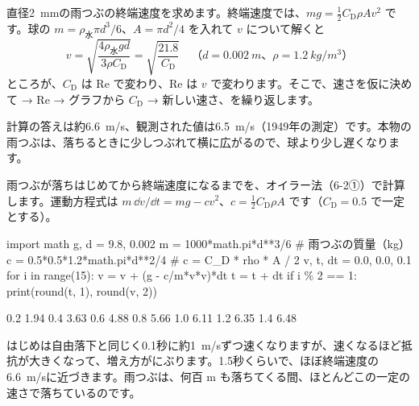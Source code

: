 直径\qty{2}{mm}の雨つぶの終端速度を求めます。終端速度では、$mg=\tfrac{1}{2}C_{\mathrm D}\rho Av^2$ です。球の $m=\rho_{\text{水}}\pi d^3/6$、$A=\pi d^2/4$ を入れて $v$ について解くと
\[v=\sqrt{\frac{4\rho_{\text{水}}gd}{3\rho C_{\mathrm D}}}=\sqrt{\frac{21.8}{C_{\mathrm D}}}\quad\text{（}d=\qty{0.002}{m}\text{、}\rho=\qty{1.2}{kg/m^3}\text{）}\]
ところが、$C_{\mathrm D}$ は Re で変わり、Re は $v$ で変わります。そこで、速さを仮に決めて → Re → グラフから $C_{\mathrm D}$ → 新しい速さ、を繰り返します。

\begin{bkcenter}
\end{bkcenter}

\noindent 計算の答えは約\qty{6.6}{m/s}、観測された値は\qty{6.5}{m/s}（1949年の測定）です。本物の雨つぶは、落ちるときに少しつぶれて横に広がるので、球より少し遅くなります。

雨つぶが落ちはじめてから終端速度になるまでを、オイラー法（6-2①）で計算します。運動方程式は $m\,\dd v/\dd t=mg-cv^2$、$c=\tfrac{1}{2}C_{\mathrm D}\rho A$ です（$C_{\mathrm D}=0.5$ で一定とする）。
\begin{phcode}
import math
g, d = 9.8, 0.002
m = 1000*math.pi*d**3/6       \# 雨つぶの質量（kg）
c = 0.5*0.5*1.2*math.pi*d**2/4 \# c = C\_D * rho * A / 2
v, t, dt = 0.0, 0.0, 0.1
for i in range(15):
    v = v + (g - c/m*v*v)*dt
    t = t + dt
    if i \% 2 == 1: print(round(t, 1), round(v, 2))
\end{phcode}
\begin{phcodeout}
0.2 1.94
0.4 3.63
0.6 4.88
0.8 5.66
1.0 6.11
1.2 6.35
1.4 6.48
\end{phcodeout}
はじめは自由落下と同じく0.1秒に約\qty{1}{m/s}ずつ速くなりますが、速くなるほど抵抗が大きくなって、増え方がにぶります。1.5秒くらいで、ほぼ終端速度の\qty{6.6}{m/s}に近づきます。雨つぶは、何百 m も落ちてくる間、ほとんどこの一定の速さで落ちているのです。

\phkokomade

